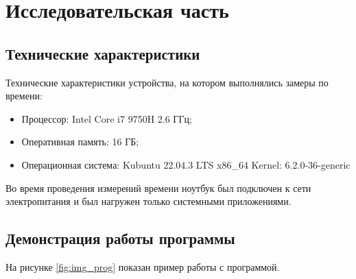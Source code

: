 \chapter{Исследовательская часть}

\section{Технические характеристики}
Технические характеристики устройства, на котором выполнялись
замеры по времени:

\begin{itemize}
    \item Процессор: Intel Core i7 9750H 2.6 ГГц;
    \item Оперативная память: 16 ГБ;
    \item Операционная система: Kubuntu 22.04.3 LTS x86\_64 Kernel: 6.2.0-36-generic
\end{itemize}

Во время проведения измерений времени ноутбук был подключен к сети электропитания и был нагружен только системными приложениями.

\section{Демонстрация работы программы}

На рисунке \ref{fig:img_prog} показан пример работы с программой.


